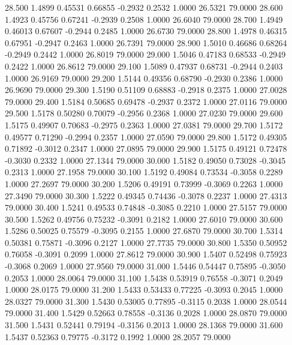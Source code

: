   28.500   1.4899   0.45531   0.66855  -0.2932   0.2532   1.0000  26.5321  79.0000
  28.600   1.4923   0.45756   0.67241  -0.2939   0.2508   1.0000  26.6040  79.0000
  28.700   1.4949   0.46013   0.67607  -0.2944   0.2485   1.0000  26.6730  79.0000
  28.800   1.4978   0.46315   0.67951  -0.2947   0.2463   1.0000  26.7391  79.0000
  28.900   1.5010   0.46686   0.68264  -0.2949   0.2442   1.0000  26.8019  79.0000
  29.000   1.5046   0.47183   0.68533  -0.2949   0.2422   1.0000  26.8612  79.0000
  29.100   1.5089   0.47937   0.68731  -0.2944   0.2403   1.0000  26.9169  79.0000
  29.200   1.5144   0.49356   0.68790  -0.2930   0.2386   1.0000  26.9690  79.0000
  29.300   1.5190   0.51109   0.68883  -0.2918   0.2375   1.0000  27.0028  79.0000
  29.400   1.5184   0.50685   0.69478  -0.2937   0.2372   1.0000  27.0116  79.0000
  29.500   1.5178   0.50280   0.70079  -0.2956   0.2368   1.0000  27.0230  79.0000
  29.600   1.5175   0.49907   0.70683  -0.2975   0.2363   1.0000  27.0381  79.0000
  29.700   1.5172   0.49577   0.71290  -0.2994   0.2357   1.0000  27.0590  79.0000
  29.800   1.5172   0.49305   0.71892  -0.3012   0.2347   1.0000  27.0895  79.0000
  29.900   1.5175   0.49121   0.72478  -0.3030   0.2332   1.0000  27.1344  79.0000
  30.000   1.5182   0.49050   0.73028  -0.3045   0.2313   1.0000  27.1958  79.0000
  30.100   1.5192   0.49084   0.73534  -0.3058   0.2289   1.0000  27.2697  79.0000
  30.200   1.5206   0.49191   0.73999  -0.3069   0.2263   1.0000  27.3490  79.0000
  30.300   1.5222   0.49345   0.74436  -0.3078   0.2237   1.0000  27.4313  79.0000
  30.400   1.5241   0.49533   0.74848  -0.3085   0.2210   1.0000  27.5157  79.0000
  30.500   1.5262   0.49756   0.75232  -0.3091   0.2182   1.0000  27.6010  79.0000
  30.600   1.5286   0.50025   0.75579  -0.3095   0.2155   1.0000  27.6870  79.0000
  30.700   1.5314   0.50381   0.75871  -0.3096   0.2127   1.0000  27.7735  79.0000
  30.800   1.5350   0.50952   0.76058  -0.3091   0.2099   1.0000  27.8612  79.0000
  30.900   1.5407   0.52498   0.75923  -0.3068   0.2069   1.0000  27.9560  79.0000
  31.000   1.5446   0.54447   0.75895  -0.3050   0.2053   1.0000  28.0064  79.0000
  31.100   1.5438   0.53919   0.76558  -0.3071   0.2049   1.0000  28.0175  79.0000
  31.200   1.5433   0.53433   0.77225  -0.3093   0.2045   1.0000  28.0327  79.0000
  31.300   1.5430   0.53005   0.77895  -0.3115   0.2038   1.0000  28.0544  79.0000
  31.400   1.5429   0.52663   0.78558  -0.3136   0.2028   1.0000  28.0870  79.0000
  31.500   1.5431   0.52441   0.79194  -0.3156   0.2013   1.0000  28.1368  79.0000
  31.600   1.5437   0.52363   0.79775  -0.3172   0.1992   1.0000  28.2057  79.0000
